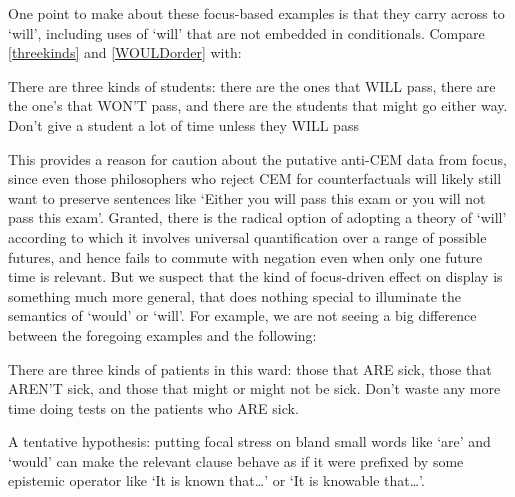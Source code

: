 \documentclass[If.tex]{subfiles}
\begin{document}
One point to make about these focus-based examples is that they carry across to ‘will’, including uses of ‘will’ that are not embedded in conditionals. Compare \ref{threekinds} and \ref{WOULDorder} with:
\begin{prop}
	\nitem
	There are three kinds of students: there are the ones that WILL pass, there are the one's that WON'T pass, and there are the students that might go either way.
	\nitem
	Don't give a student a lot of time unless they WILL pass
\end{prop}
This provides a reason for caution about the putative anti-CEM data from focus, since even those philosophers who reject CEM for counterfactuals will likely still want to preserve sentences like ‘Either you will pass this exam or you will not pass this exam’. Granted, there is the radical option of adopting a theory of ‘will’ according to which it involves universal quantification over a range of possible futures, and hence fails to commute with negation even when only one future time is relevant. But we suspect that the kind of focus-driven effect on display is something much more general, that does nothing special to illuminate the semantics of ‘would’ or ‘will’. For example, we are not seeing a big difference between the foregoing examples and the following:
\begin{prop}
	\nitem \label{sick}
	There are three kinds of patients in this ward: those that ARE sick, those that AREN'T sick, and those that might or might not be sick.
	\nitem
	Don't waste any more time doing tests on the patients who ARE sick.
\end{prop}
A tentative hypothesis: putting focal stress on bland small words like ‘are’ and ‘would’ can make the relevant clause behave as if it were prefixed by some epistemic operator like ‘It is known that\ldots{}’ or ‘It is knowable that\ldots{}’.%
\end{document}

